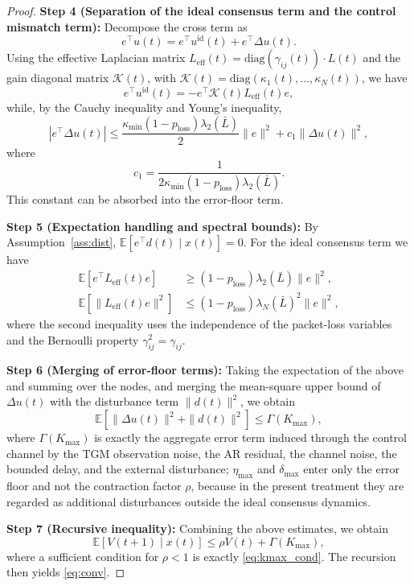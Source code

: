 \documentclass[10pt]{article}
\newcommand{\Lbar}{\bar{L}}
\newcommand{\kmin}{\kappa_{\min}}
\newcommand{\ploss}{p_{\text{loss}}}
\newcommand{\lN}{\lambda_N(\Lbar)}
\newcommand{\ltwo}{\lambda_2(\Lbar)}
\begin{document}
\begin{proof}
\textbf{Step 4 (Separation of the ideal consensus term and the control mismatch term):} Decompose the cross term as
\[
  e^\top u(t)=e^\top u^{\mathrm{id}}(t)+e^\top \Delta u(t).
\]
Using the effective Laplacian matrix $L_{\mathrm{eff}}(t)=\mathrm{diag}(\gamma_{ij}(t))\cdot L(t)$ and the gain diagonal matrix $\mathcal{K}(t)$, with $\mathcal{K}(t)=\mathrm{diag}(\kappa_1(t),\ldots,\kappa_N(t))$, we have
\[
  e^\top u^{\mathrm{id}}(t) = -e^\top \mathcal{K}(t)L_{\mathrm{eff}}(t)e,
\]
while, by the Cauchy inequality and Young's inequality,
\[
  |e^\top \Delta u(t)| \leq \frac{\kmin(1-\ploss)\ltwo}{2}\|e\|^2 + c_1\|\Delta u(t)\|^2,
\]
where
\[
  c_1=\frac{1}{2\kmin(1-\ploss)\ltwo}.
\]
This constant can be absorbed into the error-floor term.

\textbf{Step 5 (Expectation handling and spectral bounds):} By Assumption~\ref{ass:dist}, $\mathbb{E}[e^\top d(t)\mid x(t)]=0$. For the ideal consensus term we have
\[
  \begin{aligned}
    \mathbb{E}[e^\top L_{\mathrm{eff}}(t)e] &\geq (1-\ploss)\ltwo\|e\|^2,\\
    \mathbb{E}[\|L_{\mathrm{eff}}(t)e\|^2] &\leq (1-\ploss)\lN^2\|e\|^2,
  \end{aligned}
\]
where the second inequality uses the independence of the packet-loss variables and the Bernoulli property $\gamma_{ij}^2=\gamma_{ij}$.

\textbf{Step 6 (Merging of error-floor terms):} Taking the expectation of the above and summing over the nodes, and merging the mean-square upper bound of $\Delta u(t)$ with the disturbance term $\|d(t)\|^2$, we obtain
\[
  \mathbb{E}[\|\Delta u(t)\|^2+\|d(t)\|^2] \leq \Gamma(K_{\max}),
\]
where $\Gamma(K_{\max})$ is exactly the aggregate error term induced through the control channel by the TGM observation noise, the AR residual, the channel noise, the bounded delay, and the external disturbance; $\eta_{\max}$ and $\delta_{\max}$ enter only the error floor and not the contraction factor $\rho$, because in the present treatment they are regarded as additional disturbances outside the ideal consensus dynamics.

\textbf{Step 7 (Recursive inequality):} Combining the above estimates, we obtain
\[
  \mathbb{E}[V(t+1)\mid x(t)]\leq \rho V(t)+\Gamma(K_{\max}),
\]
where a sufficient condition for $\rho<1$ is exactly \eqref{eq:kmax_cond}. The recursion then yields \eqref{eq:conv}.
\end{proof}
\end{document}
